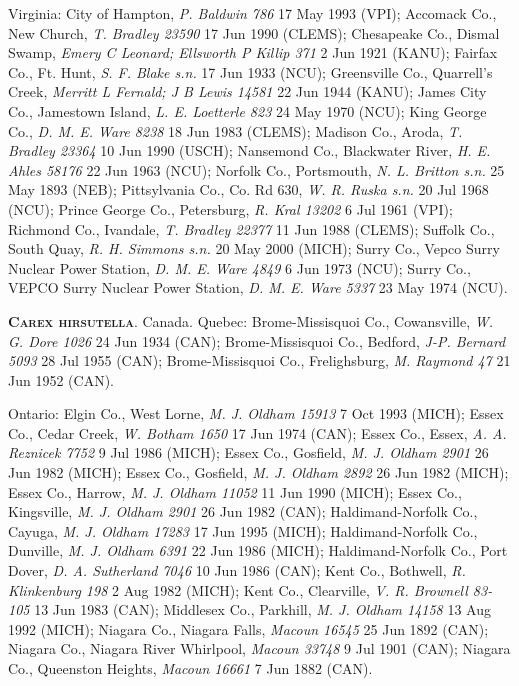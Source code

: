 \documentclass{article}
\begin{document}
Virginia:
City of Hampton, \textit{P. Baldwin 786} 17 May 1993 (VPI);
Accomack Co., New Church, \textit{T. Bradley 23590} 17 Jun 1990 (CLEMS);
Chesapeake Co., Dismal Swamp, \textit{Emery C Leonard; Ellsworth P Killip 371} 2 Jun 1921 (KANU);
Fairfax Co., Ft. Hunt, \textit{S. F. Blake s.n.} 17 Jun 1933 (NCU);
Greensville Co., Quarrell's Creek, \textit{Merritt L Fernald; J B Lewis 14581} 22 Jun 1944 (KANU);
James City Co., Jamestown Island, \textit{L. E. Loetterle 823} 24 May 1970 (NCU);
King George Co., \textit{D. M. E. Ware 8238} 18 Jun 1983 (CLEMS);
Madison Co., Aroda, \textit{T. Bradley 23364} 10 Jun 1990 (USCH);
Nansemond Co., Blackwater River, \textit{H. E. Ahles 58176} 22 Jun 1963 (NCU);
Norfolk Co., Portsmouth, \textit{N. L. Britton s.n.} 25 May 1893 (NEB);
Pittsylvania Co., Co. Rd 630, \textit{W. R. Ruska s.n.} 20 Jul 1968 (NCU);
Prince George Co., Petersburg, \textit{R. Kral 13202} 6 Jul 1961 (VPI);
Richmond Co., Ivandale, \textit{T. Bradley 22377} 11 Jun 1988 (CLEMS);
Suffolk Co., South Quay, \textit{R. H. Simmons s.n.} 20 May 2000 (MICH);
Surry Co., Vepco Surry Nuclear Power Station, \textit{D. M. E. Ware 4849} 6 Jun 1973 (NCU);
Surry Co., VEPCO Surry Nuclear Power Station, \textit{D. M. E.
  Ware	5337} 23 May 1974 (NCU).

\textbf{\textsc{Carex hirsutella}}. Canada.
Quebec:
Brome-Missisquoi Co., Cowansville, \textit{W. G. Dore 1026} 24 Jun 1934 (CAN);
Brome-Missisquoi Co., Bedford, \textit{J-P. Bernard 5093} 28 Jul 1955 (CAN);
Brome-Missisquoi Co., Frelighsburg, \textit{M. Raymond 47} 21 Jun 1952 (CAN).

Ontario:
Elgin Co., West Lorne, \textit{M. J. Oldham 15913} 7 Oct 1993 (MICH);
Essex Co., Cedar Creek, \textit{W. Botham 1650} 17 Jun 1974 (CAN);
Essex Co., Essex, \textit{A. A. Reznicek 7752} 9 Jul 1986 (MICH);
Essex Co., Gosfield, \textit{M. J. Oldham 2901} 26 Jun 1982 (MICH);
Essex Co., Gosfield, \textit{M. J. Oldham 2892} 26 Jun 1982 (MICH);
Essex Co., Harrow, \textit{M. J. Oldham 11052} 11 Jun 1990 (MICH);
Essex Co., Kingsville, \textit{M. J. Oldham 2901} 26 Jun 1982 (CAN);
Haldimand-Norfolk Co., Cayuga, \textit{M. J. Oldham 17283} 17 Jun 1995 (MICH);
Haldimand-Norfolk Co., Dunville, \textit{M. J. Oldham 6391} 22 Jun 1986 (MICH);
Haldimand-Norfolk Co., Port Dover, \textit{D. A. Sutherland 7046} 10 Jun 1986 (CAN);
Kent Co., Bothwell, \textit{R. Klinkenburg 198} 2 Aug 1982 (MICH);
Kent Co., Clearville, \textit{V. R. Brownell 83-105} 13 Jun 1983 (CAN);
Middlesex Co., Parkhill, \textit{M. J. Oldham 14158} 13 Aug 1992 (MICH);
Niagara Co., Niagara Falls, \textit{Macoun 16545} 25 Jun 1892 (CAN);
Niagara Co., Niagara River Whirlpool, \textit{Macoun 33748} 9 Jul 1901 (CAN);
Niagara Co., Queenston Heights, \textit{Macoun 16661} 7 Jun 1882 (CAN).
\end{document}
